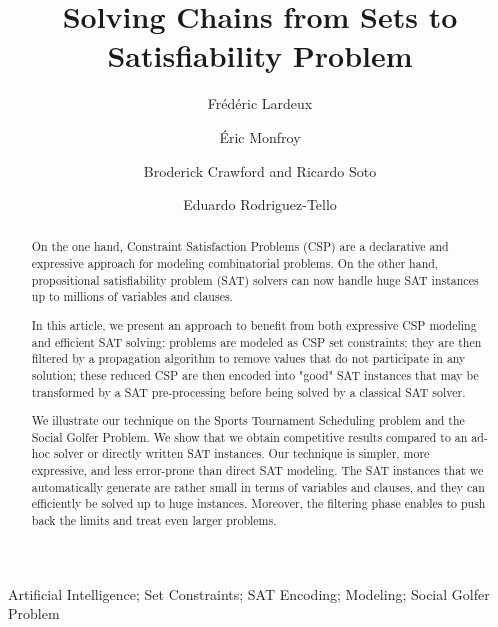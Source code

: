 \documentclass[3p,authoryear,times]{elsarticle}
\begin{document}
 
\begin{frontmatter}

\title{Solving Chains from Sets to Satisfiability Problem}

\author{Fr\'ed\'eric Lardeux}
\address{LERIA - Universit\'{e} d'Angers, Angers, France.}

\author{\'Eric Monfroy}
\address{LS2N - UMR 6004. Universit\'{e} de Nantes, Nantes, France.}

\author{Broderick Crawford and Ricardo Soto}
\address{Pontificia Universidad Cat\'olica de Valparaiso, Valparaiso 2362807, Chile.}

\author{Eduardo Rodriguez-Tello}
\address{CINVESTAV-Tamaulipas, Information Technology Laboratory, Km. 5.5 Carretera Victoria-Soto La Marina, 87130 Victoria Tamps., Mexico.}

\begin{abstract}
On the one hand, Constraint Satisfaction Problems (CSP) are a declarative and expressive approach for modeling combinatorial problems. On the other hand, propositional satisfiability problem (SAT) solvers can now handle huge SAT instances up to millions of variables and clauses. 

In this article, we present an approach to benefit from both expressive  CSP modeling and efficient SAT solving: problems are modeled as CSP set constraints; they are then filtered by a propagation algorithm to remove  values that do not participate in any solution; these reduced CSP are then encoded into "good" SAT instances that may be transformed by a SAT pre-processing before being solved by a classical SAT solver.

We illustrate our technique on the Sports Tournament Scheduling problem and the Social Golfer Problem. We show that we obtain competitive results compared to an ad-hoc solver or directly written SAT instances.
%
Our technique is simpler, more expressive, and less error-prone than direct SAT modeling. The SAT instances that we automatically generate are rather small in terms of variables and clauses, and they can efficiently be solved up to huge instances. Moreover, the filtering phase enables to push back the limits and treat even larger problems. 
\end{abstract}

\begin{keyword}
Artificial Intelligence; Set Constraints; SAT Encoding; Modeling; Social Golfer Problem
\end{keyword}

\end{frontmatter}
\end{document}
